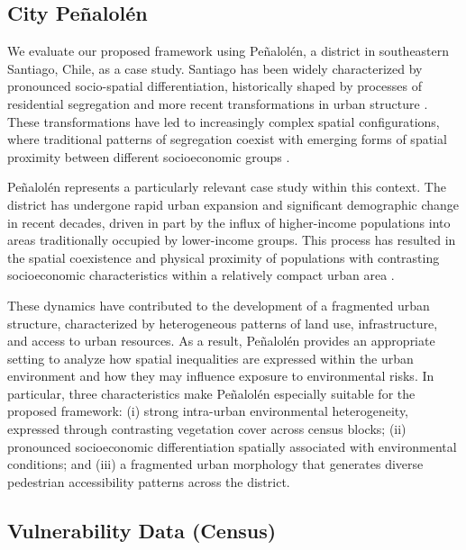 \documentclass{wscpaperproc}
\theoremstyle{wsc}
\begin{document}
\subsection{City Peñalolén}

We evaluate our proposed framework  using Peñalolén, a district in southeastern Santiago, Chile, as a case study.
 Santiago has been widely characterized by pronounced socio-spatial differentiation, historically shaped by processes of residential segregation and more recent transformations in urban structure \cite{mendez2018inequalities}. These transformations have led to increasingly complex spatial configurations, where traditional patterns of segregation coexist with emerging forms of spatial proximity between different socioeconomic groups \cite{borsdorf2016gated}.

Peñalolén represents a particularly relevant case study within this context. The district has undergone rapid urban expansion and significant demographic change in recent decades, driven in part by the influx of higher-income populations into areas traditionally occupied by lower-income groups. This process has resulted in the spatial coexistence and physical proximity of populations with contrasting socioeconomic characteristics within a relatively compact urban area \cite{villar2021penalolen}.

These dynamics have contributed to the development of a fragmented urban structure, characterized by heterogeneous patterns of land use, infrastructure, and access to urban resources. As a result, Peñalolén provides an appropriate setting to analyze how spatial inequalities are expressed within the urban environment and how they may influence exposure to environmental risks. 
In particular, three characteristics make Peñalolén especially suitable for the proposed framework: (i) strong intra-urban environmental heterogeneity, expressed through contrasting vegetation cover across census blocks; (ii) pronounced socioeconomic differentiation spatially associated with environmental conditions; and (iii) a fragmented urban morphology that generates diverse pedestrian accessibility patterns across the district.

\subsection{Vulnerability Data (Census)}
\end{document}

